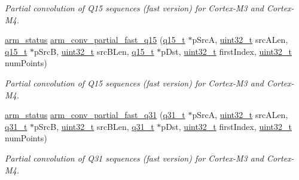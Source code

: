 \begin{DoxyCompactItemize}
\begin{DoxyCompactList}\small\item\em Partial convolution of Q15 sequences (fast version) for Cortex-\/\-M3 and Cortex-\/\-M4. \end{DoxyCompactList}\item 
\hyperlink{arm__math_8h_a5e459c6409dfcd2927bb8a57491d7cf6}{arm\-\_\-status} \hyperlink{group___partial_conv_ga1e4d43385cb62262a78c6752fe1fafb2}{arm\-\_\-conv\-\_\-partial\-\_\-fast\-\_\-q15} (\hyperlink{arm__math_8h_ab5a8fb21a5b3b983d5f54f31614052ea}{q15\-\_\-t} $\ast$p\-Src\-A, \hyperlink{stdint_8h_a435d1572bf3f880d55459d9805097f62}{uint32\-\_\-t} src\-A\-Len, \hyperlink{arm__math_8h_ab5a8fb21a5b3b983d5f54f31614052ea}{q15\-\_\-t} $\ast$p\-Src\-B, \hyperlink{stdint_8h_a435d1572bf3f880d55459d9805097f62}{uint32\-\_\-t} src\-B\-Len, \hyperlink{arm__math_8h_ab5a8fb21a5b3b983d5f54f31614052ea}{q15\-\_\-t} $\ast$p\-Dst, \hyperlink{stdint_8h_a435d1572bf3f880d55459d9805097f62}{uint32\-\_\-t} first\-Index, \hyperlink{stdint_8h_a435d1572bf3f880d55459d9805097f62}{uint32\-\_\-t} num\-Points)
\begin{DoxyCompactList}\small\item\em Partial convolution of Q15 sequences (fast version) for Cortex-\/\-M3 and Cortex-\/\-M4. \end{DoxyCompactList}\item 
\hyperlink{arm__math_8h_a5e459c6409dfcd2927bb8a57491d7cf6}{arm\-\_\-status} \hyperlink{group___partial_conv_ga10c5294cda8c4985386f4e3944be7650}{arm\-\_\-conv\-\_\-partial\-\_\-fast\-\_\-q31} (\hyperlink{arm__math_8h_adc89a3547f5324b7b3b95adec3806bc0}{q31\-\_\-t} $\ast$p\-Src\-A, \hyperlink{stdint_8h_a435d1572bf3f880d55459d9805097f62}{uint32\-\_\-t} src\-A\-Len, \hyperlink{arm__math_8h_adc89a3547f5324b7b3b95adec3806bc0}{q31\-\_\-t} $\ast$p\-Src\-B, \hyperlink{stdint_8h_a435d1572bf3f880d55459d9805097f62}{uint32\-\_\-t} src\-B\-Len, \hyperlink{arm__math_8h_adc89a3547f5324b7b3b95adec3806bc0}{q31\-\_\-t} $\ast$p\-Dst, \hyperlink{stdint_8h_a435d1572bf3f880d55459d9805097f62}{uint32\-\_\-t} first\-Index, \hyperlink{stdint_8h_a435d1572bf3f880d55459d9805097f62}{uint32\-\_\-t} num\-Points)
\begin{DoxyCompactList}\small\item\em Partial convolution of Q31 sequences (fast version) for Cortex-\/\-M3 and Cortex-\/\-M4. \end{DoxyCompactList}\item 

\end{DoxyCompactItemize}
